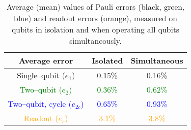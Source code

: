 %
%
%
%
%
%
%
%
%
%
\begin{table}[t]
  \centering
  \begin{tabular}{|c|| c | c |}
    \hline
    Average error & Isolated & Simultaneous \\
    \hline
    \hline
    Single--qubit ($e_{1}$) & 0.15\% & 0.16\% \\
    \textcolor{green}{Two--qubit ($e_{2}$)} & \textcolor{green}{0.36\%} & \textcolor{green}{0.62\%} \\
    \textcolor{blue}{Two--qubit, cycle ($e_{2c}$)} & \textcolor{blue}{0.65\%} & \textcolor{blue}{0.93\%} \\
    \textcolor{orange}{Readout ($e_{r}$)} & \textcolor{orange}{3.1\%} & \textcolor{orange}{3.8\%} \\
    \hline
  \end{tabular}
  \caption{Average (mean) values of Pauli errors (black, green, blue) and
           readout errors (orange), measured on qubits in isolation and when
           operating all qubits simultaneously.}
  \label{tab:pauli_errors}
\end{table}